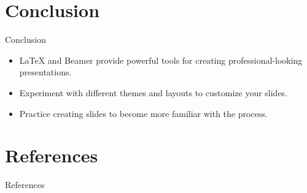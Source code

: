 \documentclass{beamer} %
\begin{document}
\section{Conclusion} %
\begin{frame}{Conclusion} %
  \begin{itemize}
    \item LaTeX and Beamer provide powerful tools for creating professional-looking presentations.
    \item Experiment with different themes and layouts to customize your slides.
    \item Practice creating slides to become more familiar with the process.
  \end{itemize}
\end{frame}


\section{References} 
\begin{frame}{References}
    \printbibliography
\end{frame}
\end{document}
